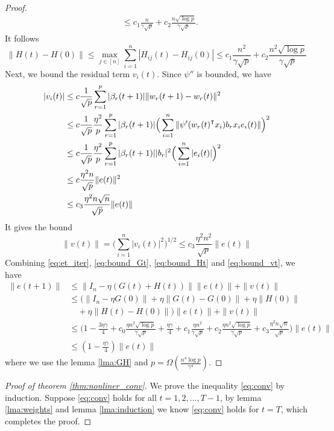 \begin{proof}
\begin{equation*}
\begin{aligned}
    &\leq c_1 \frac{n}{\gamma\sqrt p} + c_2\frac{n\sqrt{\log p}}{\gamma\sqrt p}.
\end{aligned}
\end{equation*}
It follows
\begin{equation}
\label{eq:bound_Ht}
    \|H(t)-H(0)\| \leq \max_{j \in [n]}\sum_{i=1}^n|H_{ij}(t) - H_{ij}(0)| \leq c_1 \frac{n^2}{\gamma\sqrt p} + c_2\frac{n^2\sqrt{\log p}}{\gamma\sqrt p}
\end{equation}
Next, we bound the residual term $v_i(t)$. Since $\psi''$ is bounded, we have
\begin{equation*}
\begin{aligned}
    |v_i(t)|
    &\leq c\frac{1}{\sqrt p}\sum_{r=1}^p|\beta_r(t+1)|\|w_r(t+1)-w_r(t)\|^2 \\
    &\leq c\frac{1}{\sqrt p}\frac{\eta^2}{p}\sum_{r=1}^p|\beta_r(t+1)|\Big(\sum_{i=1}^n\|\psi'(w_r(t)\transpose x_i)b_rx_ie_i(t)\|\Big)^2 \\
    &\leq c\frac{1}{\sqrt p}\frac{\eta^2}{p}\sum_{r=1}^p|\beta_r(t+1)||b_r|^2\Big(\sum_{i=1}^n|e_i(t)|\Big)^2 \\
    &\leq c\frac{\eta^2n}{\sqrt p}\|e(t)\|^2 \\
    &\leq c_3\frac{\eta^2n\sqrt n}{\sqrt p}\|e(t)\|
\end{aligned}
\end{equation*}
It gives the bound
\begin{equation}
\label{eq:bound_vt}
    \|v(t)\| =\Big(\sum_{i=1}^n|v_i(t)|^2\Big)^{1/2} \leq c_3\frac{\eta^2n^2}{\sqrt p}\|e(t)\|
\end{equation}
Combining \eqref{eq:et_iter}, \eqref{eq:bound_Gt}, \eqref{eq:bound_Ht} and \eqref{eq:bound_vt}, we have
\begin{equation}
\begin{aligned}
\|e(t+1)\| 
&\leq \|I_n-\eta (G(t)+H(t))\|\|e(t)\|+\|v(t)\| \\
&\leq \Big(\|I_n-\eta G(0)\|+\eta\|G(t)-G(0)\|+\eta\|H(0)\| \\
&\quad +\eta\|H(t)-H(0)\|\Big)\|e(t)\| + \|v(t)\| \\
&\leq \Big( 1-\frac{3\eta\gamma}{4}+c_0\frac{\eta n^2\sqrt{\log p}}{\gamma\sqrt p}+\frac{\eta\gamma}{4}+c_1\frac{\eta n^2}{\gamma\sqrt p} + c_2\frac{\eta n^2\sqrt{\log p}}{\gamma\sqrt p}+c_3\frac{\eta^2n\sqrt n}{\sqrt p}\Big)\|e(t)\|  \\
&\leq(1-\frac{\eta\gamma}{4})\|e(t)\|
\end{aligned}
\end{equation}
where we use the lemma \ref{lma:GH} and $p=\Omega(\frac{n^4\log p}{\gamma^4})$.
\end{proof}

\begin{proof}[Proof of theorem \ref{thm:nonliner_conv}]
We prove the inequality \eqref{eq:conv} by induction. Suppose \eqref{eq:conv} holds for all $t=1,2,...,T-1$, by lemma \ref{lma:weights} and lemma \ref{lma:induction} we know \eqref{eq:conv} holds for $t=T$, which completes the proof.
\end{proof}
